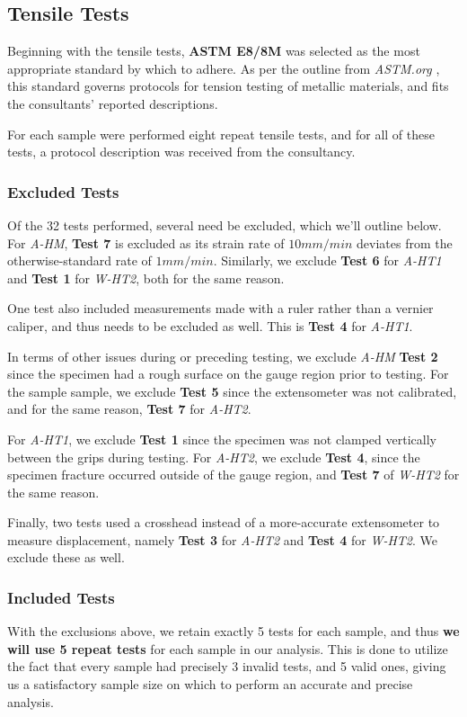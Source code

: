 \documentclass{article}
\begin{document}
\subsection{Tensile Tests}
Beginning with the tensile tests, \textbf{ASTM E8/8M} was selected as the most appropriate standard by which to adhere. As per the outline from \textit{ASTM.org} \cite{ASTME8}, this standard governs protocols for tension testing of metallic materials, and fits the consultants' reported descriptions.

For each sample were performed eight repeat tensile tests, and for all of these tests, a protocol description was received from the consultancy.

\subsubsection{Excluded Tests}

Of the 32 tests performed, several need be excluded, which we'll outline below. For \textit{A-HM}, \textbf{Test 7} is excluded as its strain rate of $10mm/min$ deviates from the otherwise-standard rate of $1mm/min$. Similarly, we exclude \textbf{Test 6} for \textit{A-HT1} and \textbf{Test 1} for \textit{W-HT2}, both for the same reason. 

One test also included measurements made with a ruler rather than a vernier caliper, and thus needs to be excluded as well. This is \textbf{Test 4} for \textit{A-HT1}.

In terms of other issues during or preceding testing, we exclude \textit{A-HM} \textbf{Test 2} since the specimen had a rough surface on the gauge region prior to testing. For the sample sample, we exclude \textbf{Test 5} since the extensometer was not calibrated, and for the same reason, \textbf{Test 7} for \textit{A-HT2}. 

For \textit{A-HT1}, we exclude \textbf{Test 1} since the specimen was not clamped vertically between the grips during testing. For \textit{A-HT2}, we exclude \textbf{Test 4}, since the specimen fracture occurred outside of the gauge region, and \textbf{Test 7} of \textit{W-HT2} for the same reason. 

Finally, two tests used a crosshead instead of a more-accurate extensometer to measure displacement, namely \textbf{Test 3} for \textit{A-HT2} and \textbf{Test 4} for \textit{W-HT2}. We exclude these as well.

\subsubsection{Included Tests}
With the exclusions above, we retain exactly 5 tests for each sample, and thus \textbf{we will use 5 repeat tests} for each sample in our analysis. This is done to utilize the fact that every sample had precisely 3 invalid tests, and 5 valid ones, giving us a satisfactory sample size on which to perform an accurate and precise analysis. 
\end{document}
